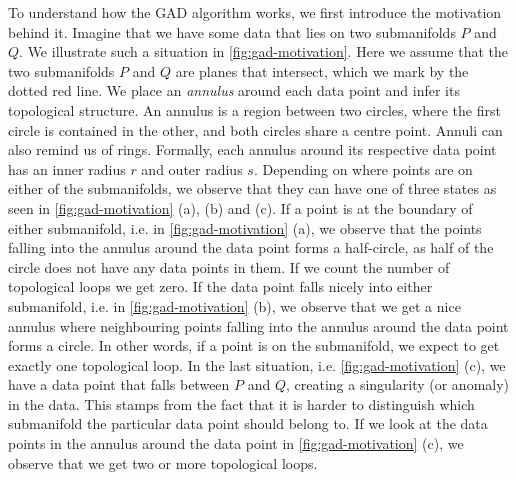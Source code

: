 To understand how the GAD algorithm works, we first introduce the motivation behind it. Imagine that we have some data that lies on two submanifolds $P$ and $Q$. We illustrate such a situation in \cref{fig:gad-motivation}. Here we assume that the two submanifolds $P$ and $Q$ are planes that intersect, which we mark by the dotted red line. We place an \textit{annulus} around each data point and infer its topological structure. An annulus is a region between two circles, where the first circle is contained in the other, and both circles share a centre point. Annuli can also remind us of rings. Formally, each annulus around its respective data point has an inner radius $r$ and outer radius $s$. Depending on where points are on either of the submanifolds, we observe that they can have one of three states as seen in \cref{fig:gad-motivation} (a), (b) and (c). If a point is at the boundary of either submanifold, i.e. in \cref{fig:gad-motivation} (a), we observe that the points falling into the annulus around the data point forms a half-circle, as half of the circle does not have any data points in them. If we count the number of topological loops we get zero. If the data point falls nicely into either submanifold, i.e. in \cref{fig:gad-motivation} (b), we observe that we get a nice annulus where neighbouring points falling into the annulus around the data point forms a circle. In other words, if a point is on the submanifold, we expect to get exactly one topological loop. In the last situation, i.e. \cref{fig:gad-motivation} (c), we have a data point that falls between $P$ and $Q$, creating a singularity (or anomaly) in the data. This stamps from the fact that it is harder to distinguish which submanifold the particular data point should belong to. If we look at the data points in the annulus around the data point in \cref{fig:gad-motivation} (c), we observe that we get two or more topological loops.
